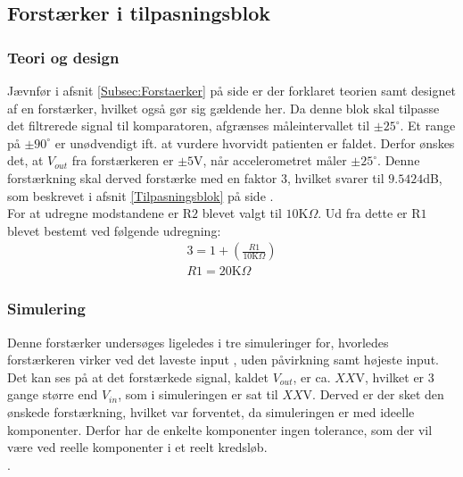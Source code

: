 \subsection{Forstærker i tilpasningsblok}
\subsubsection{Teori og design}
Jævnfør i afsnit \ref{Subsec:Forstaerker} på side \pageref{Subsec:Forstaerker} er der forklaret teorien samt designet af en forstærker, hvilket også gør sig gældende her. Da denne blok skal tilpasse det filtrerede signal til komparatoren, afgrænses måleintervallet til $\pm25^{\circ}$. Et range på $\pm90^{\circ}$ er unødvendigt ift. at vurdere hvorvidt patienten er faldet. Derfor ønskes det, at $V_{out}$ fra forstærkeren er $\pm5$V, når accelerometret måler $\pm25^{\circ}$. Denne forstærkning skal derved forstærke med en faktor 3, hvilket svarer til $9.5424$dB, som beskrevet i afsnit \ref{Tilpasningsblok} på side \pageref{Tilpasningsblok}. \\
For at udregne modstandene er R$2$ blevet valgt til $10$K$\Omega$. Ud fra dette er R$1$ blevet bestemt ved følgende udregning:
\begin{align}
3 = 1 + (\frac{R1}{10\text{K}\Omega})\\
R1 = 20\text{K}\Omega
\end{align}

\subsubsection{Simulering}
Denne forstærker undersøges ligeledes i tre simuleringer for, hvorledes forstærkeren virker ved det laveste input , uden påvirkning samt højeste input. Det kan ses på  %
at det forstærkede signal, kaldet $V_{out}$, er ca. $XX$V, hvilket er $3$ gange større end $V_{in}$, som i simuleringen er sat til $XX$V. Derved er der sket den ønskede forstærkning, hvilket var forventet, da simuleringen er med ideelle komponenter. Derfor har de enkelte komponenter ingen tolerance, som der vil være ved reelle komponenter i et reelt kredsløb. \\. 


